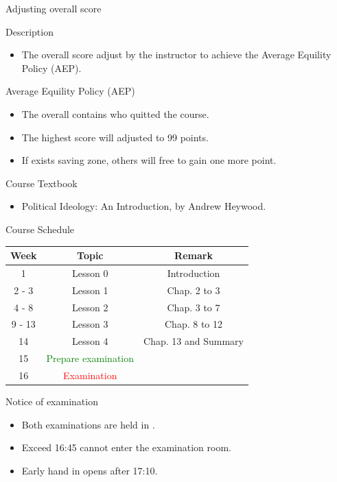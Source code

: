 \documentclass{beamer}
\begin{document}
\begin{frame}{Adjusting overall score}
\begin{block}{Description}
\begin{itemize}
\item The overall score adjust by the instructor to achieve the Average Equility Policy (AEP).
\end{itemize}
\end{block}
\begin{block}{Average Equility Policy (AEP)}
\begin{itemize}
\item The overall contains who quitted the course.
\item The highest score will adjusted to 99 points.
\item If exists saving zone, others will free to gain one more point.
\end{itemize}
\end{block}
\end{frame}
\begin{frame}{Course Textbook}
\begin{itemize}
\item Political Ideology: An Introduction, by Andrew Heywood.
\end{itemize}
\end{frame}
\begin{frame}{Course Schedule}
\begin{center}
\begin{tabular}{|c|c|c|}
\hline
Week & Topic & Remark \\
\hline
1 & Lesson 0 & Introduction\\
\hline
2 - 3 & Lesson 1 & Chap. 2 to 3 \\
\hline
4 - 8 & Lesson 2 & Chap. 3 to 7 \\
\hline
9 - 13 & Lesson 3 & Chap. 8 to 12 \\
\hline
14 & Lesson 4 & Chap. 13 and Summary \\
\hline
15 & \textcolor{Green}{Prepare examination} & \\
\hline
16 & \textcolor{red}{Examination} &  \\
\hline
\end{tabular}
\end{center}
\end{frame}
\begin{frame}{Notice of examination}
\begin{itemize}
\item Both examinations are held in .
\item Exceed 16:45 cannot enter the examination room.
\item Early hand in opens after 17:10.
\end{itemize}
\end{frame}
\end{document}
